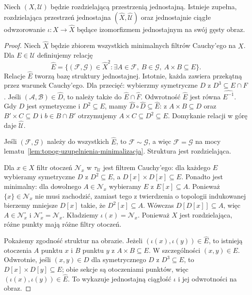 \begin{twierdzenie}
\label{thm:topog-uzupelnienia-istnienie}
Niech $(X,\mathcal U)$ będzie rozdzielającą
przestrzenią jednostajną. Istnieje zupełna,
rozdzielająca przestrzeń jednostajna
$(\widehat X,\widehat{\mathcal U})$
oraz jednostajnie ciągłe odwzorowanie
$\iota:X\to\widehat X$ będące
izomorfizmem jednostajnym na swój gęsty obraz.
\end{twierdzenie}
\begin{proof}
Niech $\widehat X$ będzie zbiorem wszystkich
minimalnych filtrów Cauchy'ego na $X$.
Dla $E\in\mathcal U$ definiujemy relację
\[
 \widehat E=\{(\mathcal F,\mathcal G)\in
 \widehat X^2:\exists A\in\mathcal F,\ B\in\mathcal G,\
 A\times B\subseteq E\}.
\]
Relacje $\widehat E$ tworzą bazę struktury jednostajnej.
Istotnie, każda zawiera przekątną przez warunek
Cauchy'ego. Dla przecięć: wybierzmy symetryczne
$D$ z $D^3\subseteq E\cap F$.
Jeśli $(\mathcal A,\mathcal B)\in\widehat D$,
to należy także do $\widehat E\cap\widehat F$.
Odwrotność $\widehat E$ jest równa
$\widehat{E^{-1}}$. Gdy $D$ jest symetryczne
i $D^2\subseteq E$, mamy
$\widehat D\circ\widehat D\subseteq\widehat E$:
z $A\times B\subseteq D$ oraz
$B'\times C\subseteq D$ i
$b\in B\cap B'$ otrzymujemy
$A\times C\subseteq D^2\subseteq E$.
Domykanie relacji w górę daje
$\widehat{\mathcal U}$.

Jeśli $(\mathcal F,\mathcal G)$ należy do
wszystkich $\widehat E$, to
$\mathcal F\sim\mathcal G$, a więc
$\mathcal F=\mathcal G$ na mocy
lematu~\ref{lem:topog-uzupelnienia-minimalizacja}.
Struktura jest rozdzielająca.

Dla $x\in X$ filtr otoczeń $\mathcal N_x$
w $\tau_{\mathcal U}$ jest filtrem Cauchy'ego:
dla każdego $E$ wybieramy symetryczne $D$
z $D^2\subseteq E$, a
$D[x]\times D[x]\subseteq E$.
Ponadto jest minimalny: dla dowolnego
$A\in\mathcal N_x$ wybieramy $E$ z
$E[x]\subseteq A$. Ponieważ
$\{x\}\in\mathcal N_x$ nie musi zachodzić,
zamiast tego z twierdzenia o topologii
indukowanej bierzemy mniejsze $D[x]$
takie, że $D^2[x]\subseteq A$.
Wówczas $D[D[x]]\subseteq A$, więc
$A\in\mathcal N_x^\circ$ i
$\mathcal N_x^\circ=\mathcal N_x$.
Kładziemy $\iota(x)=\mathcal N_x$.
Ponieważ $X$ jest rozdzielająca,
różne punkty mają różne filtry otoczeń.

Pokażemy zgodność struktur na obrazie.
Jeżeli $(\iota(x),\iota(y))\in\widehat E$,
to istnieją otoczenia $A$ punktu $x$
i $B$ punktu $y$ z $A\times B\subseteq E$.
W szczególności $(x,y)\in E$.
Odwrotnie, jeśli $(x,y)\in D$
dla symetrycznego $D$ z $D^3\subseteq E$,
to $D[x]\times D[y]\subseteq E$;
obie sekcje są otoczeniami punktów,
więc $(\iota(x),\iota(y))\in\widehat E$.
To wykazuje jednostajną ciągłość
$\iota$ i jej odwrotności na obraz.


\end{proof}
